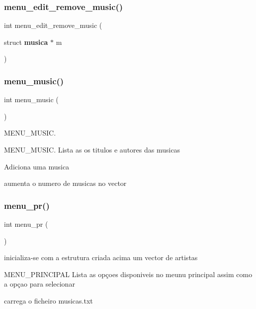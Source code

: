 \mbox{\label{project_8h_a09eb36429e9653f2df30b4127c1158ab}} 
\subsubsection{menu\_edit\_remove\_music()}
{\footnotesize\ttfamily int menu\+\_\+edit\+\_\+remove\+\_\+music (\begin{DoxyParamCaption}\item[{struct \textbf{ musica} $\ast$}]{m }\end{DoxyParamCaption})}

\mbox{\label{project_8h_a088df08a705b7c74bda39434bbefa5c8}} 
\subsubsection{menu\_music()}
{\footnotesize\ttfamily int menu\+\_\+music (\begin{DoxyParamCaption}{ }\end{DoxyParamCaption})}



M\+E\+N\+U\+\_\+\+M\+U\+S\+IC. 

M\+E\+N\+U\+\_\+\+M\+U\+S\+IC. Lista as os titulos e autores das musicas

Adiciona uma musica

aumenta o numero de musicas no vector \mbox{\label{project_8h_a5b211bda275b9a60f9dac70877e9622e}} 
\subsubsection{menu\_pr()}
{\footnotesize\ttfamily int menu\+\_\+pr (\begin{DoxyParamCaption}{ }\end{DoxyParamCaption})}



inicializa-\/se com a estrutura criada acima um vector de artistas 

M\+E\+N\+U\+\_\+\+P\+R\+I\+N\+C\+I\+P\+AL Lista as opçoes disponiveis no meunu principal assim como a opçao para selecionar

carrega o ficheiro musicas.\+txt

